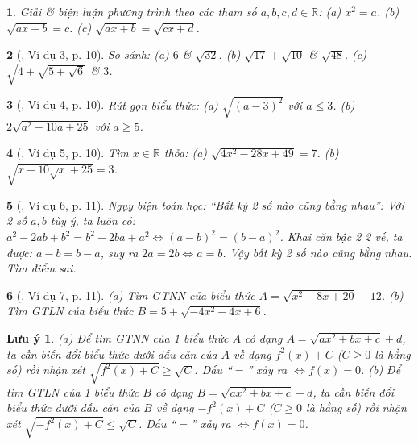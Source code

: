 \documentclass{article}
\newtheorem{baitoan}{}%
\newtheorem{luuy}{Lưu ý}
\begin{document}
\begin{baitoan}
	Giải \& biện luận phương trình theo các tham số $a,b,c,d\in\mathbb{R}$: (a) $x^2 = a$. (b) $\sqrt{ax + b} = c$. (c) $\sqrt{ax + b} = \sqrt{cx + d}$.
\end{baitoan}

\begin{baitoan}[\cite{Binh_boi_duong_Toan_9_tap_1}, Ví dụ 3, p. 10]
	So sánh: (a) $6$ \& $\sqrt{32}$. (b) $\sqrt{17} + \sqrt{10}$ \& $\sqrt{48}$. (c) $\sqrt{4 + \sqrt{5 + \sqrt{6}}}$ \& $3$.
\end{baitoan}

\begin{baitoan}[\cite{Binh_boi_duong_Toan_9_tap_1}, Ví dụ 4, p. 10]
	Rút gọn biểu thức: (a) $\sqrt{(a - 3)^2}$ với $a\le3$. (b) $2\sqrt{a^2 - 10a + 25}$ với $a\ge5$.
\end{baitoan}

\begin{baitoan}[\cite{Binh_boi_duong_Toan_9_tap_1}, Ví dụ 5, p. 10]
	Tìm $x\in\mathbb{R}$ thỏa: (a) $\sqrt{4x^2 - 28x + 49} = 7$. (b) $\sqrt{x - 10\sqrt{x} + 25} = 3$.
\end{baitoan}

\begin{baitoan}[\cite{Binh_boi_duong_Toan_9_tap_1}, Ví dụ 6, p. 11]
	Ngụy biện toán học: ``Bất kỳ 2 số nào cũng bằng nhau'': Với 2 số $a,b$ tùy ý, ta luôn có: $a^2 - 2ab + b^2 = b^2 - 2ba + a^2\Leftrightarrow(a - b)^2 = (b - a)^2$. Khai căn bậc 2 2 vế, ta được: $a - b = b - a$, suy ra $2a = 2b\Leftrightarrow a = b$. Vậy bất kỳ 2 số nào cũng bằng nhau. Tìm điểm sai.
\end{baitoan}

\begin{baitoan}[\cite{Binh_boi_duong_Toan_9_tap_1}, Ví dụ 7, p. 11]
	(a) Tìm {\rm {\rm GTNN}} của biểu thức $A = \sqrt{x^2 - 8x + 20} - 12$. (b) Tìm {\rm GTLN} của biểu thức $B = 5 + \sqrt{-4x^2 - 4x + 6}$.
\end{baitoan}

\begin{luuy}
	(a) Để tìm {\rm {\rm GTNN}} của 1 biểu thức $A$ có dạng $A = \sqrt{ax^2 + bx + c} + d$, ta cần biến đổi biểu thức dưới dấu căn của $A$ về dạng $f^2(x) + C$ ($C\ge0$ là hằng số) rồi nhận xét $\sqrt{f^2(x) + C}\ge\sqrt{C}$. Dấu ``$=$'' xảy ra $\Leftrightarrow f(x) = 0$. (b) Để tìm {\rm GTLN} của 1 biểu thức $B$ có dạng $B = \sqrt{ax^2 + bx + c} + d$, ta cần biến đổi biểu thức dưới dấu căn của $B$ về dạng $-f^2(x) + C$ ($C\ge0$  là hằng số) rồi nhận xét $\sqrt{-f^2(x) + C}\le\sqrt{C}$. Dấu ``$=$'' xảy ra $\Leftrightarrow f(x) = 0$.
\end{luuy}
\end{document}
